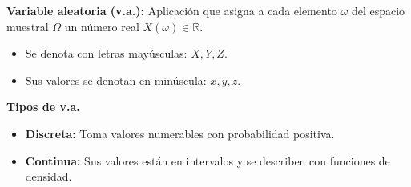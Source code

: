 \documentclass[10pt,a4paper]{article}
\begin{document}

\begin{tcolorbox}[title=Definiciones]
    \textbf{Variable aleatoria (v.a.):} Aplicación que asigna a cada elemento $\omega$ del espacio muestral $\Omega$ un número real $X(\omega) \in \mathbb{R}$.

    \begin{itemize}
        \item Se denota con letras mayúsculas: $X, Y, Z$.
        \item Sus valores se denotan en minúscula: $x, y, z$.
    \end{itemize}

    \textbf{Tipos de v.a.}
    \begin{itemize}
        \item \textbf{Discreta:} Toma valores numerables con probabilidad positiva.
        \item \textbf{Continua:} Sus valores están en intervalos y se describen con funciones de densidad.
    \end{itemize}
\end{tcolorbox}

\end{document}
